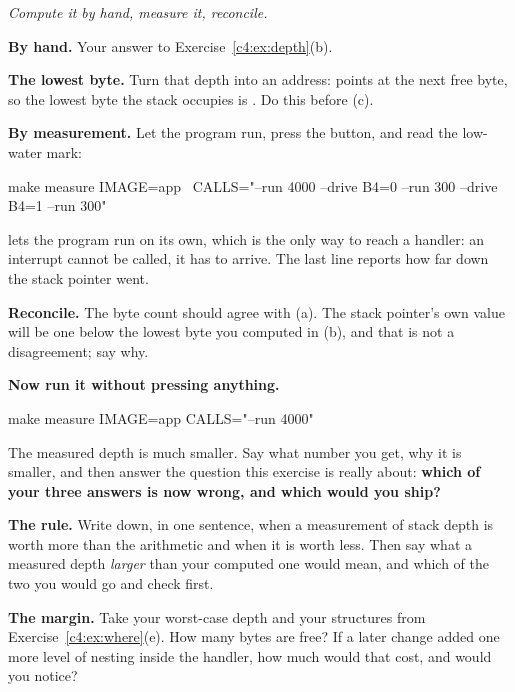\label{c4:ex:crosscheck}
\emph{Compute it by hand, measure it, reconcile.}
\begin{parts}
  \item \textbf{By hand.} Your answer to Exercise~\ref{c4:ex:depth}(b).
  \item \textbf{The lowest byte.} Turn that depth into an address:  points at the next free
    byte, so the lowest byte the stack occupies is . Do this before (c).
  \item \textbf{By measurement.} Let the program run, press the button, and read the low-water mark:
\begin{shell}
make measure IMAGE=app \
    CALLS="--run 4000 --drive B4=0 --run 300 --drive B4=1 --run 300"
\end{shell}
     lets the program run on its own, which is the only way to reach a handler: an
    interrupt cannot be called, it has to arrive. The last line reports how far down the stack
    pointer went.
  \item \textbf{Reconcile.} The byte count should agree with (a). The stack pointer's own value will
    be one below the lowest byte you computed in (b), and that is not a disagreement; say why.
  \item \textbf{Now run it without pressing anything.}
\begin{shell}
make measure IMAGE=app CALLS="--run 4000"
\end{shell}
    The measured depth is much smaller. Say what number you get, why it is smaller, and then answer
    the question this exercise is really about: \textbf{which of your three answers is now wrong,
    and which would you ship?}
  \item \textbf{The rule.} Write down, in one sentence, when a measurement of stack depth is worth
    more than the arithmetic and when it is worth less. Then say what a measured depth
    \emph{larger} than your computed one would mean, and which of the two you would go and check
    first.
  \item \textbf{The margin.} Take your worst-case depth and your structures from
    Exercise~\ref{c4:ex:where}(e). How many bytes are free? If a later change added one more level
    of nesting inside the handler, how much would that cost, and would you notice?
\end{parts}

